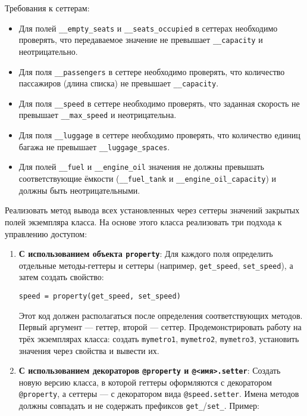\begin{enumerate}
\begin{itemize}
\end{itemize}
Требования к сеттерам:
\begin{itemize}
    \item Для полей \texttt{\_\_empty\_seats} и \texttt{\_\_seats\_occupied} в сеттерах необходимо проверять, что передаваемое значение не превышает \texttt{\_\_capacity} и неотрицательно.  
    \item Для поля \texttt{\_\_passengers} в сеттере необходимо проверять, что количество пассажиров (длина списка) не превышает \texttt{\_\_capacity}.  
    \item Для поля \texttt{\_\_speed} в сеттере необходимо проверять, что заданная скорость не превышает \texttt{\_\_max\_speed} и неотрицательна.  
    \item Для поля \texttt{\_\_luggage} в сеттере необходимо проверять, что количество единиц багажа не превышает \texttt{\_\_luggage\_spaces}.
    \item Для полей \texttt{\_\_fuel} и \texttt{\_\_engine\_oil} значения не должны превышать соответствующие ёмкости (\texttt{\_\_fuel\_tank} и \texttt{\_\_engine\_oil\_capacity}) и должны быть неотрицательными.
\end{itemize}
Реализовать метод вывода всех установленных через сеттеры значений закрытых полей экземпляра класса.
На основе этого класса реализовать три подхода к управлению доступом:
\begin{enumerate}
    \item \textbf{С использованием объекта \texttt{property}}:  
    Для каждого поля определить отдельные методы-геттеры и сеттеры (например, \texttt{get\_speed}, \texttt{set\_speed}), а затем создать свойство:  
    \begin{verbatim}
speed = property(get_speed, set_speed)
    \end{verbatim}  
    Этот код должен располагаться после определения соответствующих методов. Первый аргумент — геттер, второй — сеттер.  
    Продемонстрировать работу на трёх экземплярах класса: создать \texttt{mymetro1}, \texttt{mymetro2}, \texttt{mymetro3}, установить значения через свойства и вывести их.
    \item \textbf{С использованием декораторов \texttt{@property} и \texttt{@<имя>.setter}}:  
    Создать новую версию класса, в которой геттеры оформляются с декоратором \texttt{@property}, а сеттеры — с декоратором вида \texttt{@speed.setter}. Имена методов должны совпадать и не содержать префиксов \texttt{get\_}/\texttt{set\_}.  
    Пример:  
    \begin{verbatim}

\end{verbatim}
\end{enumerate}
\end{enumerate}
